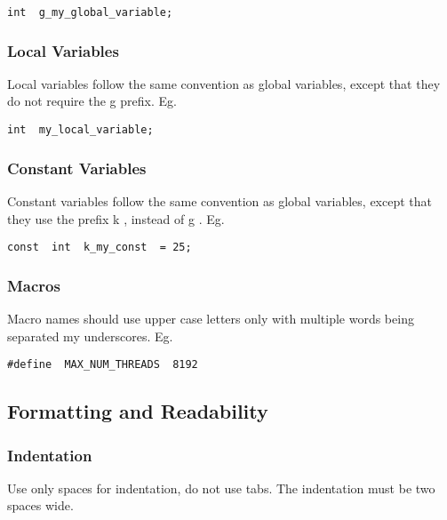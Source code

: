\smallskip
\begin{lstlisting}
int  g_my_global_variable;
\end{lstlisting}
\smallskip


\subsubsection{Local Variables}

Local variables follow the same convention as global variables, except
that they do not require the g prefix.  Eg.

\smallskip
\begin{lstlisting}
int  my_local_variable;
\end{lstlisting}
\smallskip


\subsubsection{Constant  Variables}

Constant variables follow the same convention as global variables,
except that they use the prefix k , instead of g .  Eg.

\smallskip
\begin{lstlisting}
const  int  k_my_const  = 25;
\end{lstlisting}
\smallskip


\subsubsection{Macros}

Macro names should use upper case letters only with multiple words
being separated my underscores. Eg.

\smallskip
\begin{lstlisting}
#define  MAX_NUM_THREADS  8192
\end{lstlisting}
\smallskip




\subsection{Formatting and Readability}

\subsubsection{Indentation}

Use only spaces for indentation, do not use tabs.  The indentation
must be two spaces wide.


